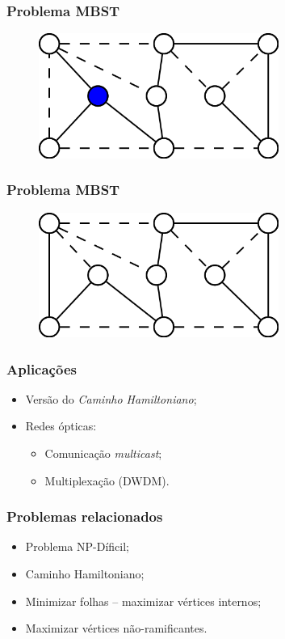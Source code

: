 \documentclass[14pt]{beamer}
\begin{document}
\begin{frame}
\frametitle{Problema MBST}
\begin{figure}
\includegraphics[width=0.7\textwidth]{figures/minbst3.png}
\end{figure}
\end{frame}

\begin{frame}
\frametitle{Problema MBST}
\begin{figure}
\includegraphics[width=0.7\textwidth]{figures/minbst4.png}
\end{figure}
\end{frame}

\begin{frame}
\frametitle{Aplica\c{c}\~oes}
\begin{itemize}
\item<1-> Vers\~ao do \emph{Caminho Hamiltoniano};
\item<2->Redes \'opticas:
\begin{itemize}
  \item Comunica\c{c}\~ao \textit{multicast};
  \item Multiplexa\c{c}\~ao (DWDM).
\end{itemize}
\end{itemize}
\end{frame}

\begin{frame}
\frametitle{Problemas relacionados}
\begin{itemize}
\item<1->Problema NP-D\'ificil;
\item<2->Caminho Hamiltoniano;
\item<3->Minimizar folhas – maximizar v\'ertices internos;
\item<4->Maximizar v\'ertices n\~ao-ramificantes.
\end{itemize}
\end{frame}
\end{document}
